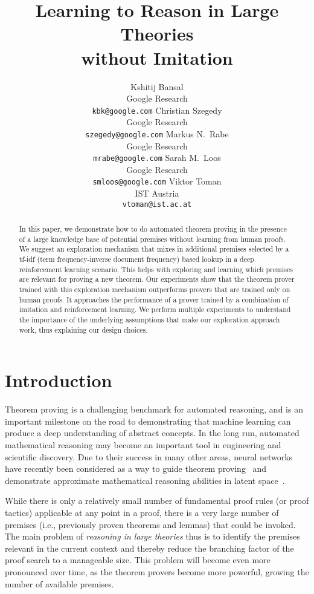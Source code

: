 \documentclass{article}
\title{Learning to Reason in Large Theories \\ without Imitation}
\author{Kshitij Bansal \\
  Google Research \\
  \texttt{kbk@google.com}
  \And
  Christian Szegedy \\
  Google Research \\
  \texttt{szegedy@google.com}
  \And
  Markus N.~Rabe \\
  Google Research \\
  \texttt{mrabe@google.com}
  \AND
  Sarah M.~Loos \\
  Google Research \\
  \texttt{smloos@google.com}
  \And
  Viktor Toman \\
  IST Austria \\
  \texttt{vtoman@ist.ac.at}
}
\begin{document}
\maketitle

\begin{abstract}
In this paper, we demonstrate how to do automated theorem proving in the presence of a large knowledge base of potential premises without learning from human proofs.
We suggest an exploration mechanism that mixes in additional premises selected by a tf-idf (term frequency-inverse document frequency) based lookup in a deep reinforcement learning scenario.
This helps with exploring and learning which premises are relevant for proving a new theorem.
Our experiments show that the theorem prover trained with this exploration mechanism outperforms provers that are trained only on human proofs.
It approaches the performance of a prover trained by a combination of imitation and reinforcement learning.
We perform multiple experiments to understand the importance of the underlying assumptions that make our exploration approach work, thus explaining our design choices.
\end{abstract}

\section{Introduction}

Theorem proving is a challenging benchmark for automated reasoning, and is an important milestone on the road to demonstrating that machine learning can produce a deep understanding of abstract concepts. 
In the long run, automated mathematical reasoning may become an important tool in engineering and scientific discovery.
Due to their success in many other areas, neural networks have recently been considered as a way to guide theorem proving~\citep{alemi2016deepmath,gauthier2017tactictoe,loos2017deep,huang2018gamepad,bansal2019holist,paliwal2020graph} and demonstrate approximate mathematical reasoning abilities in latent space~\citep{lee2020mathematical}.

While there is only a relatively small number of fundamental proof rules (or proof tactics) applicable at any point in a proof, there is a very large number of premises (i.e., previously proven theorems and lemmas) that could be invoked.
The main problem of \emph{reasoning in large theories} thus is to identify the premises relevant in the current context and thereby reduce the branching factor of the proof search to a manageable size.
This problem will become even more pronounced over time, as the theorem provers become more powerful, growing the number of available premises.
\end{document}

